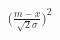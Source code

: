 \documentclass[preview]{standalone}
\begin{document}
\begin{align*}
\Big( \frac{m - x}{\sqrt{2} \sigma} \Big)^2
\end{align*}
\end{document}
